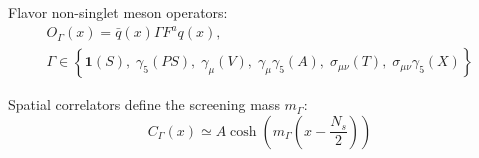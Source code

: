\documentclass[10pt, aspectratio=169]{beamer} %
\begin{document}
\begin{frame}
\vfill
Flavor non-singlet meson operators:
\begin{gather*}
    O_\Gamma(x) = \bar{q}(x)\Gamma F^aq(x), \\[2ex]
    \Gamma \in \left\{ \mathbf{1}(S),\; \gamma_5(PS),\; \gamma_\mu(V),\; \gamma_\mu\gamma_5(A),\; \sigma_{\mu\nu}(T),\; \sigma_{\mu\nu}\gamma_5(X) \right\}
\end{gather*}

\vspace{0.5em}
Spatial correlators define the screening mass $m_\Gamma$:
\[
    C_\Gamma(x) \simeq A \cosh\!\left(m_\Gamma\left(x - \frac{N_s}{2}\right)\right)
\]
\vfill
\end{frame}
\end{document}
